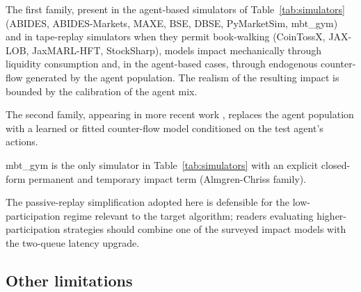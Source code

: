 \documentclass[11pt]{article}
\begin{document}
The first family, present in the agent-based simulators of Table~\ref{tab:simulators} (ABIDES, ABIDES-Markets, MAXE, BSE, DBSE, PyMarketSim, mbt\_gym) and in tape-replay simulators when they permit book-walking (CoinTossX, JAX-LOB, JaxMARL-HFT, StockSharp), models impact mechanically through liquidity consumption and, in the agent-based cases, through endogenous counter-flow generated by the agent population. The realism of the resulting impact is bounded by the calibration of the agent mix.

The second family, appearing in more recent work \citep{noble2026reality,elkarmi2025hawkeslob,berti2025deepmarket,coletta2022cgan}, replaces the agent population with a learned or fitted counter-flow model conditioned on the test agent's actions.

mbt\_gym is the only simulator in Table~\ref{tab:simulators} with an explicit closed-form permanent and temporary impact term (Almgren-Chriss family).

The passive-replay simplification adopted here is defensible for the low-participation regime relevant to the target algorithm; readers evaluating higher-participation strategies should combine one of the surveyed impact models with the two-queue latency upgrade.

\subsection{Other limitations}
\label{sec:discussion-other}
\end{document}

